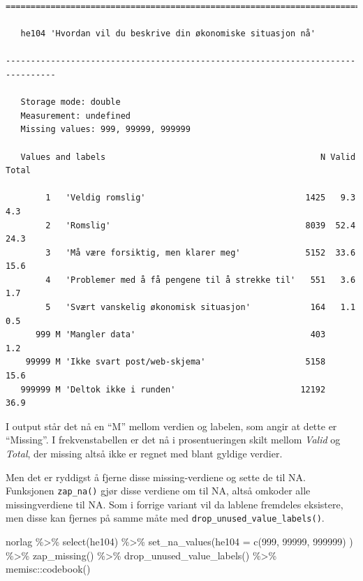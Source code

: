 \documentclass[
  letterpaper,
  DIV=11,
  numbers=noendperiod]{scrreprt}
\newenvironment{Shaded}{\begin{snugshade}}{\end{snugshade}}
\newcommand{\AttributeTok}[1]{\textcolor[rgb]{0.40,0.45,0.13}{#1}}
\newcommand{\DecValTok}[1]{\textcolor[rgb]{0.68,0.00,0.00}{#1}}
\newcommand{\FunctionTok}[1]{\textcolor[rgb]{0.28,0.35,0.67}{#1}}
\newcommand{\NormalTok}[1]{\textcolor[rgb]{0.00,0.23,0.31}{#1}}
\newcommand{\SpecialCharTok}[1]{\textcolor[rgb]{0.37,0.37,0.37}{#1}}
\begin{document}
\begin{verbatim}
================================================================================

   he104 'Hvordan vil du beskrive din økonomiske situasjon nå'

--------------------------------------------------------------------------------

   Storage mode: double
   Measurement: undefined
   Missing values: 999, 99999, 999999

   Values and labels                                           N Valid Total
                                                                            
        1   'Veldig romslig'                                1425   9.3   4.3
        2   'Romslig'                                       8039  52.4  24.3
        3   'Må være forsiktig, men klarer meg'             5152  33.6  15.6
        4   'Problemer med å få pengene til å strekke til'   551   3.6   1.7
        5   'Svært vanskelig økonomisk situasjon'            164   1.1   0.5
      999 M 'Mangler data'                                   403         1.2
    99999 M 'Ikke svart post/web-skjema'                    5158        15.6
   999999 M 'Deltok ikke i runden'                         12192        36.9
\end{verbatim}

I output står det nå en ``M'' mellom verdien og labelen, som angir at
dette er ``Missing''. I frekvenstabellen er det nå i prosentueringen
skilt mellom \emph{Valid} og \emph{Total}, der missing altså ikke er
regnet med blant gyldige verdier.

Men det er ryddigst å fjerne disse missing-verdiene og sette de til NA.
Funksjonen \texttt{zap\_na()} gjør disse verdiene om til NA, altså
omkoder alle missingverdiene til NA. Som i forrige variant vil da
lablene fremdeles eksistere, men disse kan fjernes på samme måte med
\texttt{drop\_unused\_value\_labels()}.

\begin{Shaded}
\begin{Highlighting}[]
\NormalTok{norlag }\SpecialCharTok{\%\textgreater{}\%} 
  \FunctionTok{select}\NormalTok{(he104) }\SpecialCharTok{\%\textgreater{}\%} 
  \FunctionTok{set\_na\_values}\NormalTok{(}\AttributeTok{he104 =} \FunctionTok{c}\NormalTok{(}\DecValTok{999}\NormalTok{, }\DecValTok{99999}\NormalTok{, }\DecValTok{999999}\NormalTok{) ) }\SpecialCharTok{\%\textgreater{}\%} 
  \FunctionTok{zap\_missing}\NormalTok{() }\SpecialCharTok{\%\textgreater{}\%} 
  \FunctionTok{drop\_unused\_value\_labels}\NormalTok{() }\SpecialCharTok{\%\textgreater{}\%} 
\NormalTok{  memisc}\SpecialCharTok{::}\FunctionTok{codebook}\NormalTok{()}
\end{Highlighting}
\end{Shaded}
\end{document}
